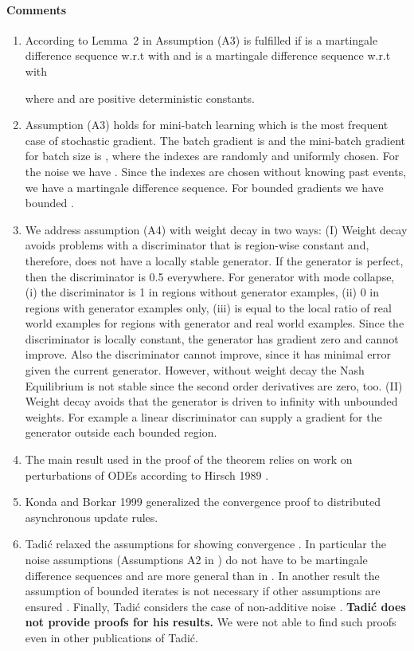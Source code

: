\documentclass{article}
\begin{document}
\paragraph{Comments}
\begin{enumerate}[label=\textbf{(C\arabic*)}]
\item
According to Lemma~2 in \cite{Bertsekas:00} Assumption (A3)
is fulfilled if
 is a martingale difference sequence
w.r.t  with
 and
 is a martingale difference sequence
w.r.t   with

where  and  are positive deterministic constants.
\item
Assumption (A3) holds for mini-batch learning which is the most
frequent case of stochastic gradient.
The batch gradient is
 and
the mini-batch gradient for batch size  is
, where the indexes 
are randomly and uniformly chosen.
For the noise  we have
.
Since the indexes are chosen without knowing past events,
we have a martingale difference sequence.
For bounded gradients we have bounded .

\item We address assumption (A4)
with weight decay in two ways: (I) Weight decay avoids problems with a
discriminator that is region-wise constant and, therefore, does not have a
locally stable generator. If the generator is perfect, then the discriminator is
0.5 everywhere. For generator with mode collapse, (i) the discriminator is 1 in
regions without generator examples, (ii) 0 in regions with generator examples
only, (iii) is equal to the local ratio of real world examples for regions with
generator and real world examples. Since the discriminator is locally constant,
the generator has gradient zero and cannot improve. Also the discriminator
cannot improve, since it has minimal error given the current generator. However,
without weight decay the Nash Equilibrium is not stable since the second order
derivatives are zero, too. (II) Weight decay avoids that the generator is driven
to infinity with unbounded weights. For example a linear discriminator can supply a gradient for the
generator outside each bounded region.

\item
The main result used in the proof of the theorem relies on work on
perturbations of ODEs according to Hirsch 1989 \cite{Hirsch:89}.

\item
Konda and Borkar 1999 \cite{Konda:99} generalized the convergence
proof to distributed asynchronous update rules.

\item
Tadi\'{c} relaxed the assumptions for showing convergence \cite{Tadic:04a}.
In particular the noise assumptions (Assumptions A2 in
\cite{Tadic:04a}) do not have to be martingale
difference sequences and are more general than in
\cite{Borkar:97}. In another result the assumption of bounded iterates
is not necessary if other assumptions are ensured \cite{Tadic:04a}.
Finally, Tadi\'{c} considers the case of non-additive noise \cite{Tadic:04a}.
{\bf Tadi\'{c} does not provide proofs for his results.}
We were not able to find such proofs even in other publications of Tadi\'{c}.

\end{enumerate}
\end{document}

